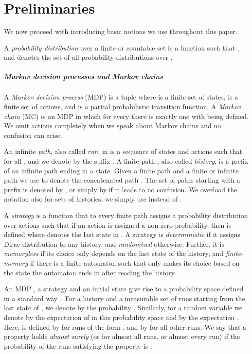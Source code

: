 \documentclass[a4paper,UKenglish]{lipics}
\begin{document}
\section{Preliminaries}
\label{sec:prelims}

We now proceed with introducing basic notions we use throughout this paper.

A {\em probability distribution} over a finite or countable set  is a function  such that
, and  denotes the set of all probability distributions over .

\subparagraph{Markov decision processes and Markov chains}
A {\em Markov decision process} (MDP) is a tuple  where  is a finite set of states,
 is a finite set of actions, and 
is a partial probabilistic transition function.
A {\em Markov chain} (MC) is an MDP in which for every  there is exactly one  with
 being defined. We omit actions completely when we speak
about Markov chains and no confusion can arise.

An infinite {\em path}, also called \emph{run}, in  is a sequence  of states and actions
such that  for all , and we denote by  the suffix .
A finite path , also called \emph{history}, is a prefix of an infinite path
ending in a state. 
Given a finite path  and a finite or infinite path 
we use  to denote the concatenated path .
The set of paths starting with a prefix  is denoted by , or simply by  if it leads to no confusion.
We overload the notation also for sets of histories, we simply use  instead of .

A {\em strategy} is a function  that to every finite path  assigns a probability distribution over actions such that
if an action  is assigned a non-zero probability, then  is defined where  denotes the last state in . A strategy  is {\em deterministic} if it assigns
Dirac distribution to any history, and {\em randomised} otherwise. Further, it is {\em memoryless} if its choice only depends on
the last state of the history, and {\em finite-memory} if there is a finite automaton such that  only makes its choice based on
the state the automaton ends in after reading the history.

An MDP , a strategy  and an initial state  give rise to a probability space  defined in a standard way~\cite{KSK76}. For a history  and a measurable set of runs  starting from the last state of , we denote by  the probability
.
Similarly, for a random variable  we denote by  the expectation of  in this probability space and by  the expectation . Here,  is defined by  for runs of the form , and by  for all other runs.
We say that a property holds {\em almost surely} (or for almost all runs, or almost every run)
if the probability of the runs satisfying the property is .
\end{document}

